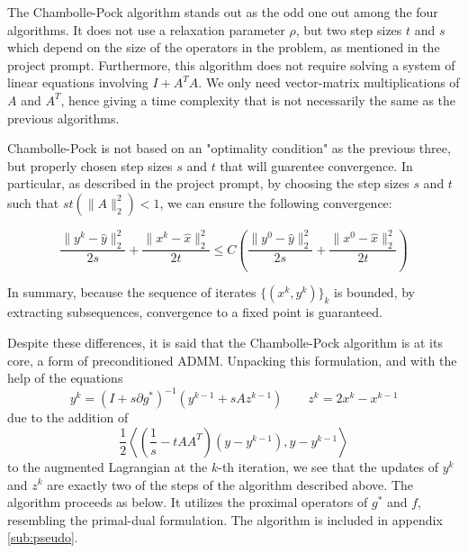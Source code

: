 \documentclass{article}
\theoremstyle{definition}
\theoremstyle{remark}
\begin{document}
\medskip

The Chambolle-Pock algorithm stands out as the odd one out among the four algorithms. It does not use a relaxation parameter $\rho$, but two step sizes $t$ and $s$ which depend on the size of the operators in the problem, as mentioned in the project prompt. Furthermore, this algorithm does not require solving a system of linear equations involving $I +A^{T}A$. We only need vector-matrix multiplications of $A$ and $A^{T}$, hence giving a time complexity that is not necessarily the same as the previous algorithms.

\medskip

Chambolle-Pock is not based on an "optimality condition" as the previous three, but properly chosen step sizes $s$ and $t$ that will guarentee convergence. In particular, as described in the project prompt, by choosing the step sizes $s$ and $t$ such that $st(\|A\|_{2}^{2}) < 1$, we can ensure the following convergence:

\begin{equation}
 \frac{\| y^{k} - \hat{y}\|_{2}^{2}}{2s}  + \frac{\| x^{k} - \hat{x} \|_{2}^{2}}{2t} \leq C \left(\frac{\| y^0 - \hat{y}\|_{2}^{2}}{2s}  + \frac{\|x^0 - \hat{x}\|_{2}^{2}}{2t} \right)
\end{equation}

In summary, because the sequence of iterates $\{ (x^k, y^k) \}_k$ is bounded, by extracting subsequences, convergence to a fixed point is guaranteed.

\medskip

Despite these differences, it is said that the Chambolle-Pock algorithm is at its core, a form of preconditioned ADMM. Unpacking this formulation, and with the help of the equations 
\[ y^{k}  = (I + s\partial g^*)^{-1}(y^{k-1} + sAz^{k-1}) \qquad z^k = 2x^k - x^{k-1} \]
due to the addition of 
\[ \frac{1}{2}\left\langle \left(\frac{1}{s} - t AA^T\right)(y - y^{k-1}), y - y^{k-1} \right\rangle \]
to the augmented Lagrangian at the $k$-th iteration, we see that the updates of $y^k$ and $z^k$ are exactly two of the steps of the algorithm described above. The algorithm proceeds as below. It utilizes the proximal operators of $g^*$ and $f$, resembling the primal-dual formulation. The algorithm is included in appendix \ref{sub:pseudo}.
\end{document}
